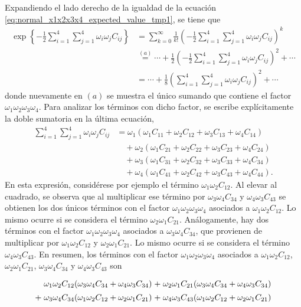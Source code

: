 \documentclass[a4paper]{report}
\begin{document}
Expandiendo el lado derecho de la igualdad de la ecuación \ref{eq:normal_x1x2x3x4_expected_value_tmp1}, se tiene que
\begin{align}\label{eq:normal_x1x2x3x4_expected_value_tmp2}
 \exp\left\{-\frac{1}{2}\sum_{i=1}^4\sum_{j=1}^4\omega_i\omega_jC_{ij}\right\}&=\sum_{k=0}^{\infty} \frac{1}{k!}\left(-\frac{1}{2}\sum_{i=1}^4\sum_{j=1}^4\omega_i\omega_jC_{ij}\right)^k\nonumber\\
  &\overset{(a)}{=}\cdots+\frac{1}{2}\left(-\frac{1}{2}\sum_{i=1}^4\sum_{j=1}^4\omega_i\omega_jC_{ij}\right)^2+\cdots\nonumber\\
  &=\cdots+\frac{1}{8}\left(\sum_{i=1}^4\sum_{j=1}^4\omega_i\omega_jC_{ij}\right)^2+\cdots
\end{align}
donde nuevamente en \((a)\) se muestra el único sumando que contiene el factor \(\omega_1\omega_2\omega_3\omega_4\). Para analizar los términos con dicho factor, se escribe explícitamente la doble sumatoria en la última ecuación,
\begin{align*}
 \sum_{i=1}^4\sum_{j=1}^4\omega_i\omega_jC_{ij}&=\omega_1(\omega_1C_{11}+\omega_2C_{12}+\omega_3C_{13}+\omega_4C_{14})\\
  &\quad+\omega_2(\omega_1C_{21}+\omega_2C_{22}+\omega_3C_{23}+\omega_4C_{24})\\
  &\quad+\omega_3(\omega_1C_{31}+\omega_2C_{32}+\omega_3C_{33}+\omega_4C_{34})\\
  &\quad+\omega_4(\omega_1C_{41}+\omega_2C_{42}+\omega_3C_{43}+\omega_4C_{44}).
\end{align*}
En esta expresión, considérese por ejemplo el término \(\omega_1\omega_2C_{12}\). Al elevar al cuadrado, se observa que al multiplicar ese término por \(\omega_3\omega_4C_{34}\) y \(\omega_4\omega_3C_{43}\) se obtienen los dos únicos términos con el factor \(\omega_1\omega_2\omega_3\omega_4\) asociados a \(\omega_1\omega_2C_{12}\). Lo mismo ocurre si se considera el término \(\omega_2\omega_1C_{21}\). Análogamente, hay dos términos con el factor \(\omega_1\omega_2\omega_3\omega_4\) asociados a \(\omega_3\omega_4C_{34}\), que provienen de multiplicar por \(\omega_1\omega_2C_{12}\) y \(\omega_2\omega_1C_{21}\). Lo mismo ocurre si se considera el término \(\omega_4\omega_3C_{43}\). En resumen, los términos con el factor \(\omega_1\omega_2\omega_3\omega_4\) asociados a \(\omega_1\omega_2C_{12}\), \(\omega_2\omega_1C_{21}\), \(\omega_3\omega_4C_{34}\) y \(\omega_4\omega_3C_{43}\) son
\[\arraycolsep=1.4pt\def\arraystretch{1.4}
 \begin{array}{cccc}
   &\omega_1\omega_2C_{12}(\omega_3\omega_4C_{34}+\omega_4\omega_3C_{34})&+&\omega_2\omega_1C_{21}(\omega_3\omega_4C_{34}+\omega_4\omega_3C_{34})\\
   +&\omega_3\omega_4C_{34}(\omega_1\omega_2C_{12}+\omega_2\omega_1C_{21})&+&\omega_4\omega_3C_{43}(\omega_1\omega_2C_{12}+\omega_2\omega_1C_{21})
 \end{array}
\]
\end{document}
